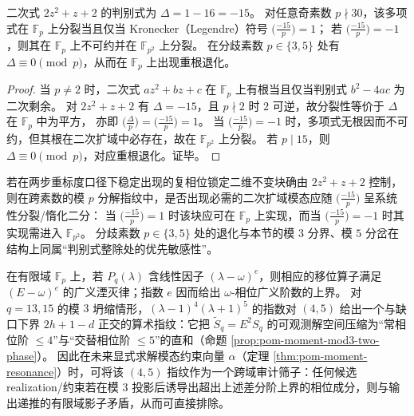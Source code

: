 \begin{proposition}\label{prop:pom-phase-lock-discriminant-minus15-splitting}
二次式 \(2z^2+z+2\) 的判别式为 \(\Delta=1-16=-15\)。
对任意奇素数 \(p\nmid 30\)，该多项式在 \(\mathbb{F}_p\) 上分裂当且仅当 Kronecker（Legendre）符号 \(\bigl(\frac{-15}{p}\bigr)=1\)；
若 \(\bigl(\frac{-15}{p}\bigr)=-1\)，则其在 \(\mathbb{F}_p\) 上不可约并在 \(\mathbb{F}_{p^{2}}\) 上分裂。
在分歧素数 \(p\in\{3,5\}\) 处有 \(\Delta\equiv 0\pmod p\)，从而在 \(\mathbb{F}_p\) 上出现重根退化。
\end{proposition}
\begin{proof}
当 \(p\ne 2\) 时，二次式 \(az^2+bz+c\) 在 \(\mathbb{F}_p\) 上有根当且仅当判别式 \(b^2-4ac\) 为二次剩余。
对 \(2z^2+z+2\) 有 \(\Delta=-15\)，且 \(p\nmid 2\) 时 \(2\) 可逆，故分裂性等价于 \(\Delta\) 在 \(\mathbb{F}_p\) 中为平方，
亦即 \(\bigl(\frac{\Delta}{p}\bigr)=\bigl(\frac{-15}{p}\bigr)=1\)。
当 \(\bigl(\frac{-15}{p}\bigr)=-1\) 时，多项式无根因而不可约，但其根在二次扩域中必存在，故在 \(\mathbb{F}_{p^2}\) 上分裂。
若 \(p\mid 15\)，则 \(\Delta\equiv 0\pmod p\)，对应重根退化。证毕。
\end{proof}

\begin{remark}\label{rem:pom-phase-lock-discriminant-minus15-prediction}
若在两步重标度口径下稳定出现的复相位锁定二维不变块确由 \(2z^2+z+2\) 控制，
则在跨素数的模 \(p\) 分解指纹中，是否出现必需的二次扩域模态应随 \(\bigl(\frac{-15}{p}\bigr)\) 呈系统性分裂/惰化二分：
当 \(\bigl(\frac{-15}{p}\bigr)=1\) 时该块应可在 \(\mathbb{F}_p\) 上实现，而当 \(\bigl(\frac{-15}{p}\bigr)=-1\) 时其实现需进入 \(\mathbb{F}_{p^2}\)。
分歧素数 \(p\in\{3,5\}\) 处的退化与本节的模 \(3\) 分界、模 \(5\) 分岔在结构上同属“判别式整除处的优先敏感性”。
\end{remark}



\begin{remark}\label{rem:pom-modp-factor-exponent-fingerprint}
在有限域 \(\mathbb{F}_p\) 上，若 \(P_q(\lambda)\) 含线性因子 \((\lambda-\omega)^e\)，则相应的移位算子满足 \((E-\omega)^e\) 的广义湮灭律；指数 \(e\) 因而给出 \(\omega\)-相位广义阶数的上界。
对 \(q=13,15\) 的模 \(3\) 坍缩情形，\((\lambda-1)^4(\lambda+1)^5\) 的指数对 \((4,5)\) 给出一个与缺口下界 \(2h+1-d\) 正交的算术指纹：它把 \(\widetilde S_q=E^2S_q\) 的可观测解空间压缩为“常相位阶 \(\le 4\)”与“交替相位阶 \(\le 5\)”的直和（命题 \ref{prop:pom-moment-mod3-two-phase}）。
因此在未来显式求解模态约束向量 \(\alpha\)（定理 \ref{thm:pom-moment-resonance}）时，可将该 \((4,5)\) 指纹作为一个跨域审计筛子：任何候选 realization/约束若在模 \(3\) 投影后诱导出超出上述差分阶上界的相位成分，则与输出递推的有限域影子矛盾，从而可直接排除。
\end{remark}
